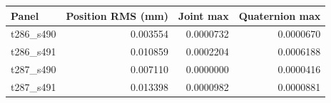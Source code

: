 \begin{tabular}{lrrr}
\toprule
Panel & Position RMS (mm) & Joint max & Quaternion max\\
\midrule
t286\_s490 & 0.003554 & 0.0000732 & 0.0000670\\
t286\_s491 & 0.010859 & 0.0002204 & 0.0006188\\
t287\_s490 & 0.007110 & 0.0000000 & 0.0000416\\
t287\_s491 & 0.013398 & 0.0000982 & 0.0000881\\
\bottomrule
\end{tabular}
